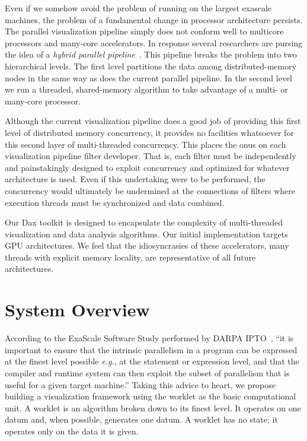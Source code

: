 \documentclass{vgtc}                          %
\newcommand*{\lcite}[1]{~\cite{#1}}
\newcommand*{\keyterm}[1]{\emph{#1}}
\begin{document}
Even if we somehow avoid the problem of running on the largest exascale
machines, the problem of a fundamental change in processor architecture
persists.  The parallel visualization pipeline simply does not conform well
to multicore processors and many-core accelerators.  In response several
researchers are pursing the idea of a \keyterm{hybrid parallel
  pipeline}\lcite{Camp10,Howison11,Li08}.  This pipeline breaks the problem
into two hierarchical levels.  The first level partitions the data among
distributed-memory nodes in the same way as does the current parallel
pipeline.  In the second level we run a threaded, shared-memory algorithm
to take advantage of a multi- or many-core processor.

Although the current visualization pipeline does a good job of providing
this first level of distributed memory concurrency, it provides no
facilities whatsoever for this second layer of multi-threaded concurrency.
This places the onus on each visualization pipeline filter developer.  That
is, each filter must be independently and painstakingly designed to exploit
concurrency and optimized for whatever architecture is used.  Even if this
undertaking were to be performed, the concurrency would ultimately be undermined
at the connections of filters where execution threads must be synchronized
and data combined.

Our Dax toolkit is designed to encapsulate the complexity of multi-threaded
visualization and data analysis algorithms.  Our initial implementation
targets GPU architectures.  We feel that the idiosyncrasies of these
accelerators, many threads with explicit memory locality, are
representative of all future architectures.

\section{System Overview}
\label{sec:SystemOverview}

According to the ExaScale Software Study performed by DARPA
IPTO\lcite{DARPAExascaleStudy}, ``it is important to ensure that the
intrinsic parallelism in a program can be expressed at the finest level
possible \emph{e.g.}, at the statement or expression level, and that the
compiler and runtime system can then exploit the subset of parallelism that
is useful for a given target machine.''  Taking this advice to heart, we
propose building a visualization framework using the worklet as the basic
computational unit.  A worklet is an algorithm broken down to its finest
level.  It operates on one datum and, when possible, generates one datum.
A worklet has no state; it operates only on the data it is given.
\end{document}
